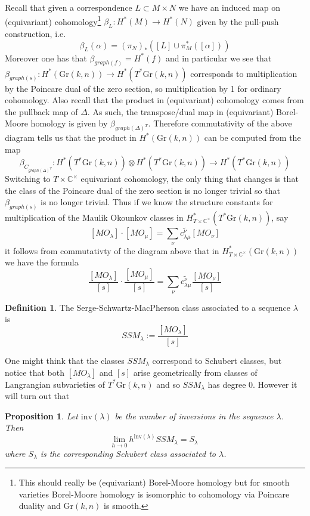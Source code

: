\documentclass[12pt]{amsart}
\numberwithin{equation}{section}
\newtheorem{Proposition}[equation]{Proposition}
\theoremstyle{definition}
\newtheorem{Definition}[equation]{Definition}
\numberwithin{figure}{section}
\newcommand{\C}{\mathbb{C}}
\newcommand{\grass}[2]{\mathrm{Gr}(#1,#2)}
\begin{document}
Recall that given a correspondence $L\subset M\times N$ we have an induced map on (equivariant) cohomology\footnote{This should really be (equivariant) Borel-Moore homology but for smooth varieties Borel-Moore homology is isomorphic to cohomology via Poincare duality and $\grass{k}{n}$ is smooth.} $\beta_L: H^*(M)\to H^*(N)$ given by the pull-push construction, i.e.
\[  \beta_L(\alpha)=(\pi_N)_* ([L]\cup \pi^*_M([\alpha])) \]
Moreover one has that $\beta_{graph(f)}=H^*(f)$ and in particular we see that $\beta_{graph(s)}:H^*(\grass{k}{n})\to H^*(T^*\grass{k}{n})$ corresponds to multiplication by the Poincare dual of the zero section, so multiplication by 1 for ordinary cohomology. Also recall that the product in (equivariant) cohomology comes from the pullback map of $\Delta$. As such, the transpose/dual map in (equivariant) Borel-Moore homology is given by $\beta_{graph(\Delta)^T}$. Therefore commutativity of the above diagram tells us that the product in $H^*(\grass{k}{n})$ can be computed from the map
\[ \beta_{C_{graph(\Delta)^T}}:H^*( T^*\grass{k}{n})\otimes H^*(T^* \grass{k}{n} )\to H^*( T^*\grass{k}{n})  \]
Switching to $T\times \C^\times$ equivariant cohomology, the only thing that changes is that the class of the Poincare dual of the zero section is no longer trivial so that $\beta_{graph(s)}$ is no longer trivial. Thus if we know the structure constants for multiplication of the Maulik Okounkov classes in $H^*_{T\times \C^\times}( T^*\grass{k}{n})$, say
\[  [MO_\lambda]\cdot [MO_{\mu}]=\sum_\nu \widetilde{c^\nu_{\lambda \mu}} [MO_\nu] \]
it follows from commutativty of the diagram above that in $H^*_{T\times \C^\times}( \grass{k}{n})$ we have the formula
\[  \frac{[MO_\lambda]}{[s]}\cdot \frac{[MO_{\mu}]}{[s]}=\sum_\nu \widetilde{c^\nu_{\lambda \mu}} \frac{[MO_\nu]}{[s]} \]

\begin{Definition}
The Serge-Schwartz-MacPherson class associated to a sequence $\lambda$ is
\[ SSM_\lambda:= \frac{[MO_\lambda]}{[s]}  \]
\end{Definition}

One might think that the classes $SSM_\lambda$ correspond to Schubert classes, but notice that both $[MO_\lambda]$ and $[s]$ arise geometrically from classes of Langrangian subvarieties of $T^*\grass{k}{n}$ and so $SSM_\lambda$ has degree 0. However it will turn out that

\begin{Proposition}
Let $\mathrm{inv}(\lambda)$ be the number of inversions in the sequence $\lambda$. Then
\[  \underset{h\to 0}{\mathrm{lim}} \ h^{\mathrm{inv}(\lambda)} SSM_\lambda=S_\lambda \]
where $S_\lambda$ is the corresponding Schubert class associated to $\lambda$. 
\end{Proposition} 
\end{document}
